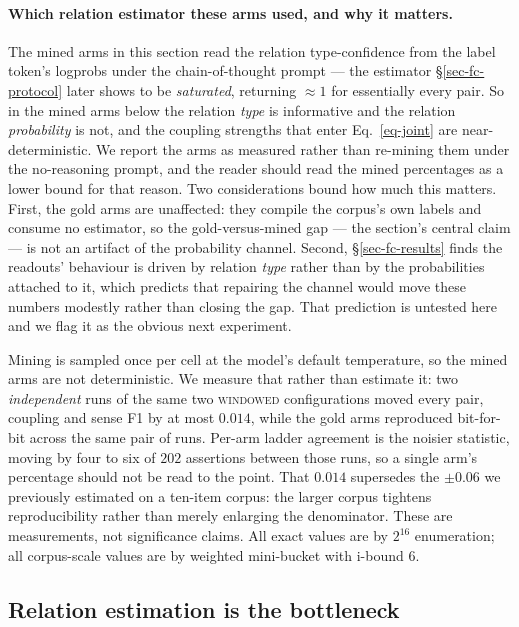 \paragraph{Which relation estimator these arms used, and why it matters.} The mined arms in this
section read the relation type-confidence from the label token's logprobs under the
chain-of-thought prompt --- the estimator \S\ref{sec-fc-protocol} later shows to be
\emph{saturated}, returning $\approx\!1$ for essentially every pair. So in the mined arms below the
relation \emph{type} is informative and the relation \emph{probability} is not, and the coupling
strengths that enter Eq.~\ref{eq-joint} are near-deterministic. We report the arms as measured rather
than re-mining them under the no-reasoning prompt, and the reader should read the mined percentages as
a lower bound for that reason. Two considerations bound how much this matters. First, the gold arms are
unaffected: they compile the corpus's own labels and consume no estimator, so the gold-versus-mined gap
--- the section's central claim --- is not an artifact of the probability channel. Second,
\S\ref{sec-fc-results} finds the readouts' behaviour is driven by relation \emph{type} rather than by
the probabilities attached to it, which predicts that repairing the channel would move these numbers
modestly rather than closing the gap. That prediction is untested here and we flag it as the obvious
next experiment.

Mining is sampled once per cell at the model's default temperature, so the mined arms are not
deterministic. We measure that rather than estimate it: two \emph{independent} runs of the same two
\textsc{windowed} configurations moved every pair, coupling and sense F1 by at most $0.014$, while the
gold arms reproduced bit-for-bit across the same pair of runs. Per-arm ladder agreement is the noisier
statistic, moving by four to six of $202$ assertions between those runs, so a single arm's percentage
should not be read to the point. That $0.014$ supersedes the $\pm 0.06$ we previously estimated on a
ten-item corpus: the larger corpus tightens reproducibility rather than merely enlarging the
denominator. These are measurements, not significance claims. All exact values are by $2^{16}$
enumeration; all corpus-scale values are by weighted mini-bucket with i-bound $6$.

\subsection{Relation estimation is the bottleneck}
\label{sec-bottleneck}

